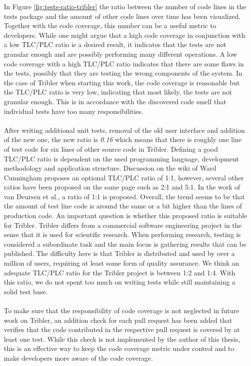 In Figure \ref{fig:tests-ratio-tribler} the ratio between the number of code lines in the tests package and the amount of other code lines over time has been visualized. Together with the code coverage, this number can be a useful metric to developers. While one might argue that a high code coverage in conjunction with a low TLC/PLC ratio is a desired result, it indicates that the tests are not granular enough and are possibly performing many different operations. A low code coverage with a high TLC/PLC ratio indicates that there are some flaws in the tests, possibly that they are testing the wrong components of the system. In the case of Tribler when starting this work, the code coverage is reasonable but the TLC/PLC ratio is very low, indicating that most likely, the tests are not granular enough. This is in accordance with the discovered code smell that individual tests have too many responsibilities.\\\\
After writing additional unit tests, removal of the old user interface and addition of the new one, the new ratio is \emph{0.16} which means that there is roughly one line of test code for six lines of other source code in Tribler. Defining a good TLC/PLC ratio is dependent on the used programming language, development methodology and application structure. Discussion on the wiki of Ward Cunningham\cite{c2tlcratio} proposes an optional TLC/PLC ratio of 1:1, however, several other ratios have been proposed on the same page such as 2:1 and 5:1. In the work of van Deursen et al.\cite{van2001refactoring}, a ratio of 1:1 is proposed. Overall, the trend seems to be that the amount of test line code is around the same or a bit higher than the lines of production code. An important question is whether this proposed ratio is suitable for Tribler. Tribler differs from a commercial software engineering project in the sense that it is used for scientific research. When performing research, testing is considered a subordinate task and the main focus is gathering results that can be published. The difficulty here is that Tribler is distributed and used by over a million of users, requiring at least some form of quality assurance. We think an adequate TLC/PLC ratio for the Tribler project is between 1:2 and 1:4. With this ratio, we do not spent too much on writing tests while still maintaining a solid test base.\\\\
To make sure that the responsibility of code coverage is not neglected in future work on Tribler, an addition check for each pull request has been added that verifies that the code contributed in the respective pull request is covered by at least one test. While this check is not implemented by the author of this thesis, this is an effective way to keep the code coverage metric under control and to make developers more aware of the code coverage.

